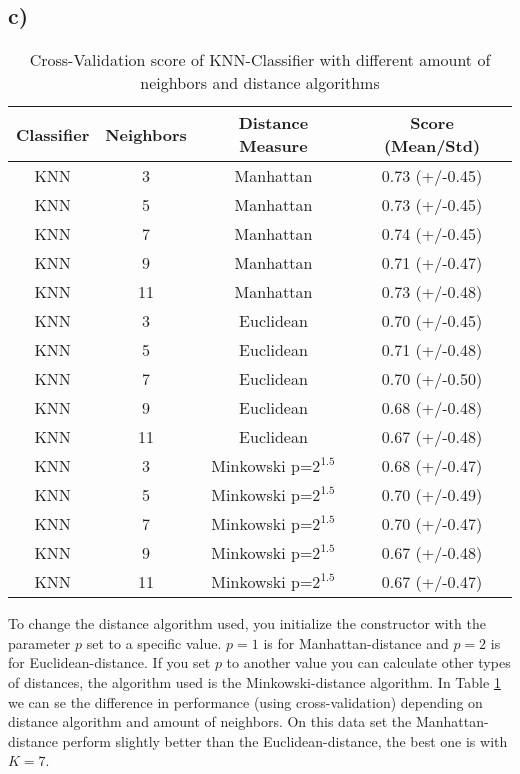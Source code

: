 \documentclass{article}
\begin{document}
      \subsection{c)}
        \label{ssc:1c}
        \begin{table}[h]
          \centering
          \label{tbl:task1c}
          \begin{tabular}{cccc}
            \toprule
            Classifier &  Neighbors & Distance Measure &           Score (Mean/Std)\\
            \midrule
            KNN &          3 &              Manhattan &  0.73 (+/-0.45) \\
            KNN &          5 &              Manhattan &  0.73 (+/-0.45) \\
            KNN &          7 &              Manhattan &  0.74 (+/-0.45) \\
            KNN &          9 &              Manhattan &  0.71 (+/-0.47) \\
            KNN &         11 &              Manhattan &  0.73 (+/-0.48) \\
            KNN &          3 &              Euclidean &  0.70 (+/-0.45) \\
            KNN &          5 &              Euclidean &  0.71 (+/-0.48) \\
            KNN &          7 &              Euclidean &  0.70 (+/-0.50) \\
            KNN &          9 &              Euclidean &  0.68 (+/-0.48) \\
            KNN &         11 &              Euclidean &  0.67 (+/-0.48) \\
            KNN &          3 &  Minkowski p=$2^{1.5}$ &  0.68 (+/-0.47) \\
            KNN &          5 &  Minkowski p=$2^{1.5}$ &  0.70 (+/-0.49) \\
            KNN &          7 &  Minkowski p=$2^{1.5}$ &  0.70 (+/-0.47) \\
            KNN &          9 &  Minkowski p=$2^{1.5}$ &  0.67 (+/-0.48) \\
            KNN &         11 &  Minkowski p=$2^{1.5}$ &  0.67 (+/-0.47) \\
            \bottomrule
          \end{tabular}
          \caption{Cross-Validation score of KNN-Classifier with different amount of neighbors and distance algorithms}
        \end{table}
        To change the distance algorithm used, you initialize the constructor with the parameter $p$ set to a 
        specific value. $p=1$ is for Manhattan-distance and $p=2$ is for Euclidean-distance.
        If you set $p$ to another value you can calculate other types of distances, the algorithm used 
        is the Minkowski-distance algorithm.
        In Table \ref{tbl:task1c} we can se the difference in performance (using cross-validation) depending on distance algorithm 
        and amount of neighbors. On this data set the Manhattan-distance perform slightly 
        better than the Euclidean-distance, the best one is with $K=7$.
\end{document}
